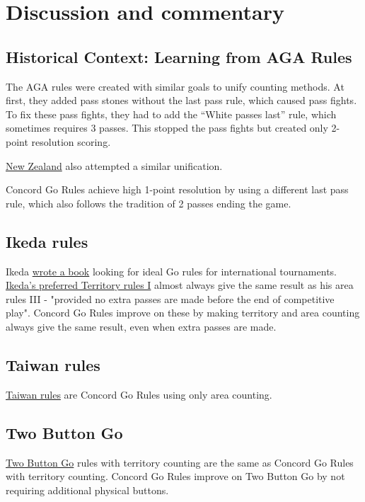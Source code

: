 \documentclass[11pt]{article}
\begin{document}
\newpage

\section*{Discussion and commentary}

\subsection*{Historical Context: Learning from AGA Rules}

The AGA rules were created with similar goals to unify counting methods.
At first, they added pass stones without the last pass rule, which caused pass fights.
To fix these pass fights, they had to add the ``White passes last'' rule, which sometimes requires 3 passes.
This stopped the pass fights but created only 2-point resolution scoring.

\href{https://go.org.nz/index.php/about-go/history-of-nz-rules-of-go}{New Zealand} also attempted a similar unification.

Concord Go Rules achieve high 1-point resolution by using a different last pass rule, which also follows the tradition of 2 passes ending the game.

\subsection*{Ikeda rules}
Ikeda \href{https://gobase.org/studying/rules/ikeda/}{wrote a book} looking for ideal Go rules for international tournaments.
\href{https://gobase.org/studying/rules/ikeda/?sec=e_rules}{Ikeda's preferred Territory rules I} almost always give the same result as his area rules III
- "provided no extra passes are made before the end of competitive play".
Concord Go Rules improve on these by making territory and area counting always give the same result, even when extra passes are made.

\subsection*{Taiwan rules}
\href{https://senseis.xmp.net/?TaiwanRules}{Taiwan rules} are Concord Go Rules using only area counting.

\subsection*{Two Button Go}
\href{https://senseis.xmp.net/?TwoButtonGo}{Two Button Go} rules with territory counting are the same as Concord Go Rules with territory counting.
Concord Go Rules improve on Two Button Go by not requiring additional physical buttons.
\end{document}
